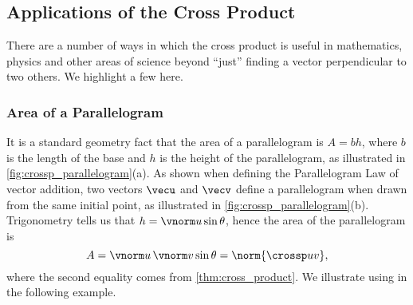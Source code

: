 
\subsection*{Applications of the Cross Product}

There are a number of ways in which the cross product is useful in mathematics, physics and other areas of science beyond ``just'' finding a vector perpendicular to two others. We highlight a few here.

\subsubsection*{Area of a Parallelogram}

It is a standard geometry fact that the area of a parallelogram is $A = bh$, where $b$ is the length of the base and $h$ is the height of the parallelogram, as illustrated in \autoref{fig:crossp_parallelogram}(a). As shown when defining the Parallelogram Law of vector addition, two vectors $\vecu$ and $\vecv$ define a parallelogram when drawn from the same initial point, as illustrated in \autoref{fig:crossp_parallelogram}(b). Trigonometry tells us that $h = \vnorm u \sin \theta$, hence the area of the parallelogram is 
\begin{equation}A = \vnorm u\,\vnorm v\sin\theta = \norm{\crossp uv},\label{eq:crossp1}\end{equation}
where the second equality comes from \autoref{thm:cross_product}.
We illustrate using  in the following example.

